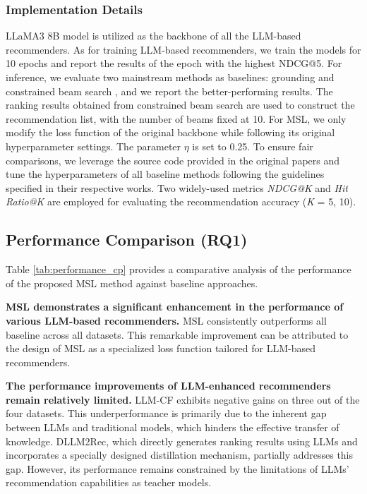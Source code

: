 \documentclass[sigconf,natbib=true]{acmart}
\begin{document}
\subsubsection{Implementation Details} 
LLaMA3 8B model \cite{dubey2024llama} is utilized as the backbone of all the LLM-based recommenders.
As for training LLM-based recommenders, we train the models for 10 epochs and report the results of the epoch with the highest NDCG@5. 
For inference, we evaluate two mainstream methods as baselines: grounding \cite{bao2023bi} and constrained beam search \cite{zhu2024collaborative}, and we report the better-performing results. The ranking results obtained from constrained beam search are used to construct the recommendation list, with the number of beams fixed at 10.
For MSL, we only modify the loss function of the original backbone while following its original hyperparameter settings. The parameter \(\eta\) is set to 0.25.
To ensure fair comparisons, we leverage the source code provided in the original papers and tune the hyperparameters of all baseline methods following the guidelines specified in their respective works. 
Two widely-used metrics \textit{NDCG@K} and \textit{Hit Ratio@K} are employed for evaluating the recommendation accuracy (\textit{K} = 5, 10).

\subsection{Performance Comparison (RQ1)}
\label{sec:cp_exp}
Table \ref{tab:performance_cp} provides a comparative analysis of the performance of the proposed MSL method against baseline approaches. 

\textbf{MSL demonstrates a significant enhancement in the performance of various LLM-based recommenders.} MSL consistently outperforms all baseline across all datasets. This remarkable improvement can be attributed to the design of MSL as a specialized loss function tailored for LLM-based recommenders. 

\textbf{The performance improvements of LLM-enhanced recommenders remain relatively limited.} LLM-CF exhibits negative gains on three out of the four datasets. This underperformance is primarily due to the inherent gap between LLMs and traditional models, which hinders the effective transfer of knowledge. 
DLLM2Rec, which directly generates ranking results using LLMs and incorporates a specially designed distillation mechanism, partially addresses this gap. However, its performance remains constrained by the limitations of LLMs' recommendation capabilities as teacher models.
\end{document}
